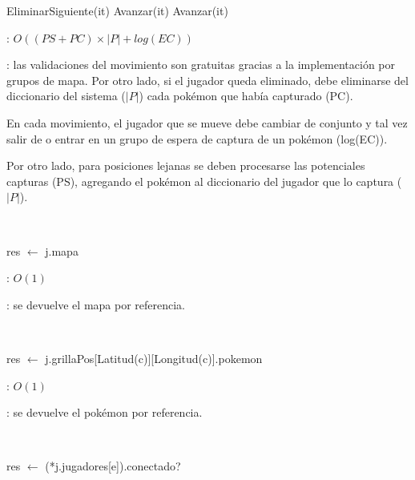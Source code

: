 \begin{Algoritmos}
\begin{algorithm}[H]
{{{					
					EliminarSiguiente(it)
				}{
					Avanzar(it)
				}
			}{
				Avanzar(it)
			}
		}
	\end{algorithm}

	\complejidad: $O((PS + PC) \times |P| + log(EC))$

	\justifcomp: las validaciones del movimiento son gratuitas gracias a la implementación por grupos de mapa. Por otro lado, si el jugador queda eliminado, debe eliminarse del diccionario del sistema ($|P|$) cada pokémon que había capturado (PC).

	En cada movimiento, el jugador que se mueve debe cambiar de conjunto y tal vez salir de o entrar en un grupo de espera de captura de un pokémon (log(EC)).

	Por otro lado, para posiciones lejanas se deben procesarse las potenciales capturas (PS), agregando el pokémon al diccionario del jugador que lo captura ($|P|$).

	~

	\begin{algorithm}[H]
		\NoCaptionOfAlgo
		\caption{}
		res $\leftarrow$ j.mapa
	\end{algorithm}

	\complejidad: $O(1)$

	\justifcomp: se devuelve el mapa por referencia.

	~

	\begin{algorithm}[H]
		\NoCaptionOfAlgo
		\caption{}
		res $\leftarrow$ j.grillaPos[Latitud(c)][Longitud(c)].pokemon
	\end{algorithm}

	\complejidad: $O(1)$

	\justifcomp: se devuelve el pokémon por referencia.

	~

	\begin{algorithm}[H]
		\NoCaptionOfAlgo
		\caption{}
		res $\leftarrow$ (*j.jugadores[e]).conectado?
	\end{algorithm}


\end{Algoritmos}
